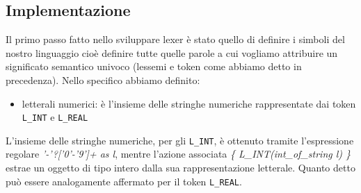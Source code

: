 \documentclass[a4paper,10pt]{article}
\begin{document}
\subsection{Implementazione}
Il primo passo fatto nello sviluppare lexer \`e stato quello di definire i 
simboli del nostro linguaggio cio\`e definire tutte quelle parole a cui vogliamo
attribuire un significato semantico univoco (lessemi e token come abbiamo detto
in precedenza). Nello specifico abbiamo definito:
\begin{itemize}
 \item letterali numerici: \`e l'insieme delle stringhe numeriche 
rappresentate dai token \verb|L_INT| e \verb|L_REAL|
\end{itemize}
L'insieme delle stringhe numeriche, per gli \verb|L_INT|, \`e ottenuto 
tramite l'espressione regolare \textit{'-'?['0'-'9']+ as l}, mentre l'azione
associata \textit{\{ L\_INT(int\_of\_string l) \}} estrae un oggetto di tipo
intero dalla sua rappresentazione letterale.
Quanto detto pu\`o essere analogamente affermato per il token \verb|L_REAL|.
\end{document}
